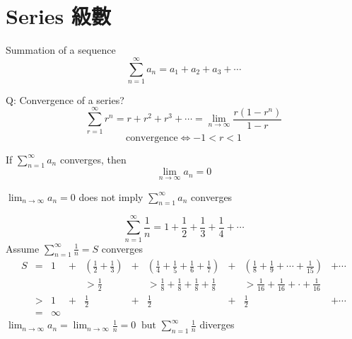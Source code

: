 \section{Series 級數}
\begin{defn}[Series]
Summation of a sequence
\[\displaystyle \sum^{\infty}_{n = 1} a_n = a_1 + a_2 + a_3 + \cdots\]
\end{defn}
Q: Convergence of a series?
\[\displaystyle \sum^{\infty}_{r = 1} r^n = r + r^2 + r^3 + \cdots = \lim_{n \to \infty} \frac{r(1 - r^n)}{1 - r}\]
\[\text{convergence} \Leftrightarrow - 1 < r < 1\]
\begin{theorem}
If \(\displaystyle \sum^{\infty}_{n = 1} a_n\) converges, then
\[\lim_{n \to \infty} a_n = 0\]
\end{theorem}
\begin{notn}
\(\displaystyle \lim_{n \to \infty} a_n = 0\) does not imply \(\sum^{\infty}_{n = 1} a_n\) converges
\end{notn}
\begin{eg}
\[\displaystyle \sum^{\infty}_{n = 1} \frac{1}{n} = 1 + \frac{1}{2} + \frac{1}{3} + \frac{1}{4} + \cdots\]
Assume \(\displaystyle \sum^{\infty}_{n = 1} \frac{1}{n} = S\) converges
\[\begin{array}{rccccccccl}
S & = & 1 & + & \displaystyle (\frac{1}{2} + \frac{1}{3}) & + & \displaystyle (\frac{1}{4} + \frac{1}{5} + \frac{1}{6} + \frac{1}{7}) & + & \displaystyle (\frac{1}{8} + \frac{1}{9} + \cdots + \frac{1}{15}) & + \cdots\\
&&&& > \frac{1}{2} && > \frac{1}{8} + \frac{1}{8} + \frac{1}{8} + \frac{1}{8} && > \frac{1}{16} + \frac{1}{16} + \cdot + \frac{1}{16}\\
& > & \displaystyle 1 & + & \displaystyle \frac{1}{2} & + & \displaystyle \frac{1}{2} & + & \displaystyle \frac{1}{2} & + \cdots\\
& = & \infty
\end{array}\]
\(\displaystyle \lim_{n \to \infty} a_n = \lim_{n \to \infty} \frac{1}{n} = 0\ \text{ but } \sum^{\infty}_{n = 1} \frac{1}{n}\) diverges
\end{eg}

